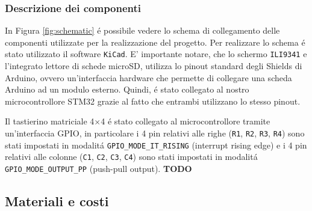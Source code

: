 \documentclass[a4paper]{article}
\begin{document}
\subsubsection{Descrizione dei componenti}

In Figura \ref{fig:schematic} é possibile vedere lo schema di collegamento
delle componenti utilizzate per la realizzazione del progetto. Per realizzare
lo schema é stato utilizzato il software \texttt{KiCad}.
E' importante notare, che lo schermo \texttt{ILI9341} e l'integrato lettore
di schede microSD, utilizza lo pinout standard degli Shields di Arduino,
ovvero un'interfaccia hardware che permette di collegare una scheda Arduino
ad un modulo esterno. Quindi, é stato collegato al nostro microcontrollore
STM32 grazie al fatto che entrambi utilizzano lo stesso pinout.

Il tastierino matriciale 4$\times$4 é stato collegato al microcontrollore
tramite un'interfaccia GPIO, in particolare i 4 pin relativi alle righe
(\texttt{R1}, \texttt{R2}, \texttt{R3}, \texttt{R4}) sono stati impostati
in modalitá \texttt{GPIO\_MODE\_IT\_RISING} (interrupt rising edge) e i 4 pin
relativi alle colonne (\texttt{C1}, \texttt{C2}, \texttt{C3}, \texttt{C4})
sono stati impostati in modalitá \texttt{GPIO\_MODE\_OUTPUT\_PP}
(push-pull output). \textbf{TODO}


\subsection{Materiali e costi} %
\end{document}
